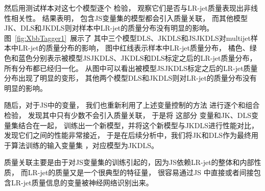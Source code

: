 然后用测试样本对这七个模型逐个
检验，
观察它们是否与LR-jet质量表现出非线性相关性。
结果表明，
包含JS变量集的模型都会引入质量关联，
而其他模型JK、DLS和JKDLS则对样本中LR-jet的质量分布没有明显的影响。
图~\ref{fig:XbbTagger1}~展示了
其中三个模型DLS、JKDLS和JSJKDLS对multijet样本中LR-jet的质量分布的影响，
图中红线表示样本中LR-jet质量分布，
橘色、绿色和蓝色分别表示被模型JSJKDLS、JKDLS和DLS标定之后的LR-jet质量分布，
所有分布都已经归一化。
从图中可以看出被模型JSJKDLS标定之后的LR-jet质量分布出现了明显的变形，
其他两个模型DLS和JKDLS则对LR-jet的质量分布没有明显的影响。


随后，对于JS中的变量，
我们也重新利用了上述变量控制的方法
进行逐个和组合检验，%
发现其中只有少数不会引入质量关联，
于是将
这部分
变量和JK、DLS变量集结合在一起，
训练出一个新模型，并将这个新模型与JKDLS进行性能对比，
发现它们之间的性能非常接近，
于是在后续分析中，我们将JK和DLS作为最终用于算法训练的输入变量集
，对应模型为JKDLS。

质量关联主要是由于对JS变量集的训练引起的，因为JS依赖LR-jet的整体和内部性质，
而LR-jet的质量又是一个很典型的特征量，
很容易通过JS
中直接或者间接包含LR-jet质量信息的变量被神经网络识别出来。





